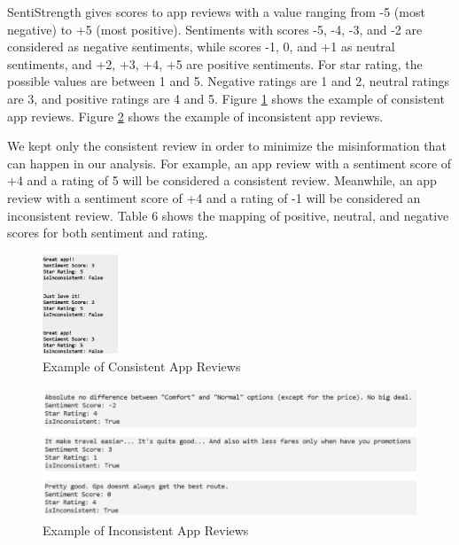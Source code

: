 \documentclass[12pt]{article}
\begin{document}
SentiStrength gives scores to app reviews with a value ranging from -5 (most negative) to +5 (most positive). Sentiments with scores -5, -4, -3, and -2 are considered as negative sentiments, while scores -1, 0, and +1 as neutral sentiments, and +2, +3, +4, +5 are positive sentiments. For star rating, the possible values are between 1 and 5. Negative ratings are 1 and 2, neutral ratings are 3, and positive ratings are 4 and 5. Figure \ref{fig:example_of_consistent} shows the example of consistent app reviews. Figure \ref{fig:example_of_inconsistent} shows the example of inconsistent app reviews.

We kept only the consistent review in order to minimize the misinformation that can happen in our analysis. For example, an app review with a sentiment score of +4 and a rating of 5 will be considered a consistent review. Meanwhile, an app review with a sentiment score of +4 and a rating of -1 will be considered an inconsistent review. Table 6 shows the mapping of positive, neutral, and negative scores for both sentiment and rating.

\begin{figure}[!h]
\begin{center}
\includegraphics[width=0.2\textwidth]{figures/example_consistent_review.png}
\caption{Example of Consistent App Reviews}
\label{fig:example_of_consistent}
\end{center}
\end{figure}

\begin{figure}[!h]
\begin{center}
\includegraphics[width=1\textwidth]{figures/example_inconsistent_review.png}
\caption{Example of Inconsistent App Reviews}
\label{fig:example_of_inconsistent}
\end{center}
\end{figure}
\end{document}
